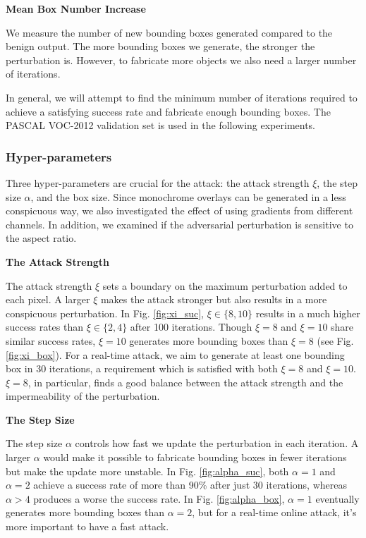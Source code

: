 \textbf{Mean Box Number Increase}

We measure the number of new bounding boxes generated compared to the benign output. The more bounding boxes we generate, the stronger the perturbation is. However, to fabricate more objects we also need a larger number of iterations.

In general, we will attempt to find the minimum number of iterations required to achieve a satisfying success rate and fabricate enough bounding boxes. The PASCAL VOC-2012 validation set is used in the following experiments.

\subsubsection{Hyper-parameters}
\label{sec:hyper}

Three hyper-parameters are crucial for the attack: the attack strength $\xi$, the step size $\alpha$, and the box size. Since monochrome overlays can be generated in a less conspicuous way, we also investigated the effect of using gradients from different channels. In addition, we examined if the adversarial perturbation is sensitive to the aspect ratio.

\textbf{The Attack Strength}

The attack strength $\xi$ sets a boundary on the maximum perturbation added to each pixel. A larger $\xi$ makes the attack stronger but also results in a more conspicuous perturbation. In Fig. \ref{fig:xi_suc}, $\xi \in \{8, 10\}$ results in a much higher success rates than $\xi \in \{2, 4\}$ after 100 iterations. Though $\xi=8$ and $\xi=10$ share similar success rates, $\xi=10$ generates more bounding boxes than $\xi=8$ (see Fig. \ref{fig:xi_box}). For a real-time attack, we aim to generate at least one bounding box in 30 iterations, a requirement which is satisfied with both $\xi=8$ and $\xi=10$. $\xi=8$, in particular, finds a good balance between the attack strength and the impermeability of the perturbation.

\textbf{The Step Size}

The step size $\alpha$ controls how fast we update the perturbation in each iteration. A larger $\alpha$ would make it possible to fabricate bounding boxes in fewer iterations but make the update more unstable. In Fig. \ref{fig:alpha_suc}, both $\alpha=1$ and $\alpha=2$ achieve a success rate of more than 90\% after just 30 iterations, whereas $\alpha > 4$ produces a worse the success rate. In Fig. \ref{fig:alpha_box}, $\alpha=1$ eventually generates more bounding boxes than $\alpha=2$, but for a real-time online attack, it's more important to have a fast attack.

